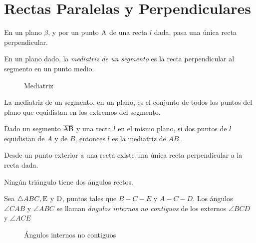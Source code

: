 \clearpage
\section{Rectas Paralelas y Perpendiculares}

\begin{theorem}
    En un plano $\beta$, y por un punto $\rm A$ de una recta $l$ dada, pasa una única recta perpendicular.
\end{theorem}

\begin{definition}
    En un plano dado, la \textit{mediatriz de un segmento} es la recta perpendicular al segmento en un punto medio.

    \begin{figure}[!h]
        \centering
        
        \caption{Mediatriz}
        \label{fig:mediatriz}
    \end{figure}
    
\end{definition}

\begin{theorem}
    La mediatriz de un segmento, en un plano, es el conjunto de todos los puntos del plano que equidistan en los extremos del segmento.
\end{theorem}

\begin{theorem}
    Dado un segmento $\overline{\rm AB}$ y una recta $l$ en el mismo plano, si dos puntos de $l$ equidistan de $A$ y de $B$, entonces $l$ es la mediatriz de $AB$.
\end{theorem}

\begin{theorem}
    Desde un punto exterior a una recta existe una única recta perpendicular a la recta dada.
\end{theorem}

\begin{theorem}
    Ningún triángulo tiene dos ángulos rectos.
\end{theorem}

\clearpage

\begin{definition}

Sea $\triangle{ABC}, \rm E$ y $\rm D$, puntos tales que $B-C-E$ y $A-C-D$. Los ángulos $\angle{CAB}$ y $\angle{ABC}$ se llaman \textit{ángulos internos no contiguos} de los externos $\angle{BCD}$ y $\angle{ACE}$

    \begin{figure}[!h]
        \centering
        
        \caption{Ángulos internos no contiguos}
        \label{fig:ang-internos-no-contiguos}
    \end{figure}
    
\end{definition}

